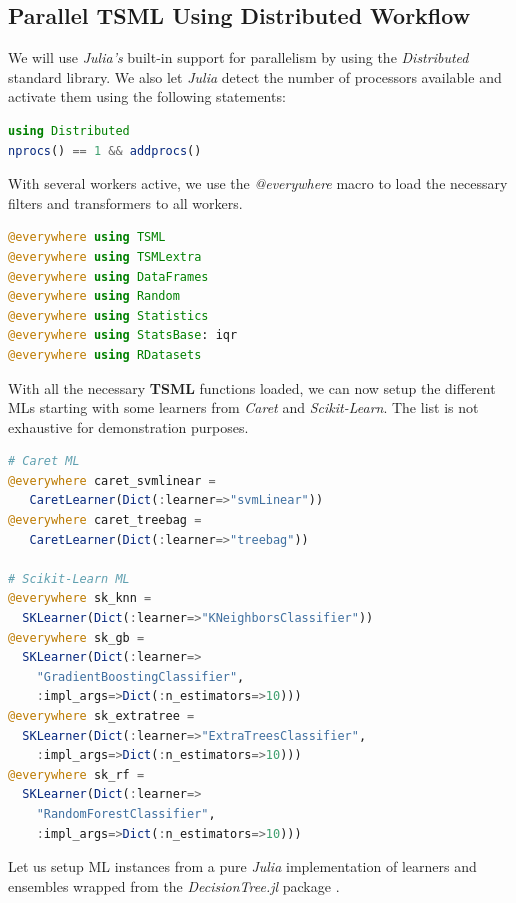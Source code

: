 \documentclass{juliacon}
\begin{document}
\subsection{Parallel TSML Using Distributed Workflow}

We will use \emph{Julia's} built-in support for parallelism by using the \emph{Distributed} standard library. We also let \emph{Julia} detect the number of processors available and activate them using the following statements:

\begin{lstlisting}[language = Julia]
using Distributed 
nprocs() == 1 && addprocs()
\end{lstlisting}

With several workers active, we use the \emph{@everywhere} macro to load the necessary filters and transformers to all workers.

\begin{lstlisting}[language = Julia]
@everywhere using TSML
@everywhere using TSMLextra
@everywhere using DataFrames
@everywhere using Random
@everywhere using Statistics
@everywhere using StatsBase: iqr
@everywhere using RDatasets
\end{lstlisting}

With all the necessary \textbf{TSML} functions loaded, we can now setup the different MLs starting with some learners from \emph{Caret} and \emph{Scikit-Learn}. The list is not exhaustive for demonstration purposes.

\begin{lstlisting}[language = Julia]
# Caret ML
@everywhere caret_svmlinear = 
   CaretLearner(Dict(:learner=>"svmLinear"))
@everywhere caret_treebag = 
   CaretLearner(Dict(:learner=>"treebag"))

# Scikit-Learn ML
@everywhere sk_knn = 
  SKLearner(Dict(:learner=>"KNeighborsClassifier"))
@everywhere sk_gb = 
  SKLearner(Dict(:learner=>
    "GradientBoostingClassifier",
    :impl_args=>Dict(:n_estimators=>10)))
@everywhere sk_extratree = 
  SKLearner(Dict(:learner=>"ExtraTreesClassifier",
    :impl_args=>Dict(:n_estimators=>10)))
@everywhere sk_rf = 
  SKLearner(Dict(:learner=>
    "RandomForestClassifier",
    :impl_args=>Dict(:n_estimators=>10)))
\end{lstlisting}

Let us setup ML instances from a pure \emph{Julia} implementation of learners and ensembles wrapped from the \emph{DecisionTree.jl} package \cite{decisiontree2008,orchestra2014,combineml2016,tsmlextra2019}.
\end{document}
